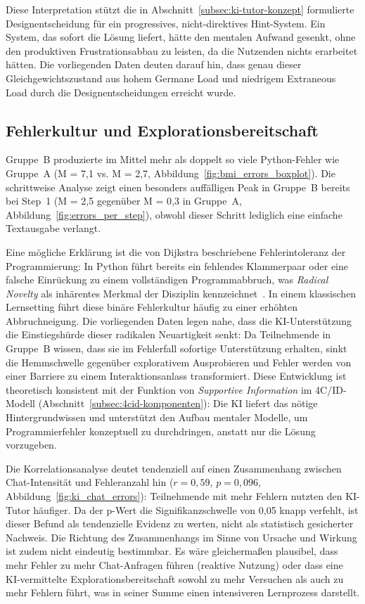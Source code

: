Diese Interpretation stützt die in Abschnitt~\ref{subsec:ki-tutor-konzept} formulierte Designentscheidung für ein progressives, nicht-direktives Hint-System. Ein System, das sofort die Lösung liefert, hätte den mentalen Aufwand gesenkt, ohne den produktiven Frustrationsabbau zu leisten, da die Nutzenden nichts erarbeitet hätten. Die vorliegenden Daten deuten darauf hin, dass genau dieser Gleichgewichtszustand aus hohem Germane Load und niedrigem Extraneous Load durch die Designentscheidungen erreicht wurde.

\subsection{Fehlerkultur und Explorationsbereitschaft}\label{subsec:diskussion_fehler}

Gruppe~B produzierte im Mittel mehr als doppelt so viele Python-Fehler wie Gruppe~A (M = 7{,}1 vs. M = 2{,}7, Abbildung~\ref{fig:bmi_errors_boxplot}). Die schrittweise Analyse zeigt einen besonders auffälligen Peak in Gruppe~B bereits bei Step~1 (M = 2{,}5 gegenüber M = 0{,}3 in Gruppe~A, Abbildung~\ref{fig:errors_per_step}), obwohl dieser Schritt lediglich eine einfache Textausgabe verlangt.

Eine mögliche Erklärung ist die von Dijkstra beschriebene Fehlerintoleranz der Programmierung: In Python führt bereits ein fehlendes Klammerpaar oder eine falsche Einrückung zu einem vollständigen Programmabbruch, was \textit{Radical Novelty} als inhärentes Merkmal der Disziplin kennzeichnet~\cite{jenkins2002}. In einem klassischen Lernsetting führt diese binäre Fehlerkultur häufig zu einer erhöhten Abbruchneigung. Die vorliegenden Daten legen nahe, dass die KI-Unterstützung die Einstiegshürde dieser radikalen Neuartigkeit senkt: Da Teilnehmende in Gruppe~B wissen, dass sie im Fehlerfall sofortige Unterstützung erhalten, sinkt die Hemmschwelle gegenüber explorativem Ausprobieren und Fehler werden von einer Barriere zu einem Interaktionsanlass transformiert. Diese Entwicklung ist theoretisch konsistent mit der Funktion von \textit{Supportive Information} im 4C/ID-Modell (Abschnitt~\ref{subsec:4cid-komponenten}): Die KI liefert das nötige Hintergrundwissen und unterstützt den Aufbau mentaler Modelle, um Programmierfehler konzeptuell zu durchdringen, anstatt nur die Lösung vorzugeben.

Die Korrelationsanalyse deutet tendenziell auf einen Zusammenhang zwischen Chat-Intensität und Fehleranzahl hin (\(r = 0{,}59\), \(p = 0{,}096\), Abbildung~\ref{fig:ki_chat_errors}): Teilnehmende mit mehr Fehlern nutzten den KI-Tutor häufiger. Da der p-Wert die Signifikanzschwelle von 0{,}05 knapp verfehlt, ist dieser Befund als tendenzielle Evidenz zu werten, nicht als statistisch gesicherter Nachweis. Die Richtung des Zusammenhangs im Sinne von Ursache und Wirkung ist zudem nicht eindeutig bestimmbar. Es wäre gleichermaßen plausibel, dass mehr Fehler zu mehr Chat-Anfragen führen (reaktive Nutzung) oder dass eine KI-vermittelte Explorationsbereitschaft sowohl zu mehr Versuchen als auch zu mehr Fehlern führt, was in seiner Summe einen intensiveren Lernprozess darstellt.

